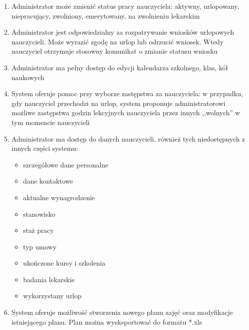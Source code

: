 \documentclass{article}
\begin{document}
\begin{enumerate}
\item Administrator może zmienić status pracy nauczyciela: aktywny, urlopowany, niepracujący, zwolniony, emerytowany, na zwolnieniu lekarskim
\item Administrator jest odpowiedzialny za rozpatrywanie wniosków urlopowych nauczycieli. Może wyrazić zgodę na urlop lub odrzucić wniosek. Wtedy nauczyciel otrzymuje stosowny komunikat o zmianie statusu wniosku
\item Administrator ma pełny dostęp do edycji kalendarza szkolnego, klas, kół naukowych
\item System oferuje pomoc przy wyborze zastępstwa za nauczyciela:
w przypadku, gdy nauczyciel przechodzi na urlop, system proponuje administratorowi możliwe zastępstwa godzin lekcyjnych nauczyciela przez innych ,,wolnych'' w tym momencie nauczycieli
\item Administrator ma dostęp do danych nauczycieli, również tych niedostępnych z innych części systemu:
\begin{itemize}
\item szczegółowe dane personalne
\item dane kontaktowe
\item aktualne wynagrodzenie
\item stanowisko
\item staż pracy
\item typ umowy
\item ukończone kursy i szkolenia
\item badania lekarskie
\item wykorzystany urlop
\end{itemize}
\item System oferuje możliwość stworzenia nowego planu zajęć oraz modyfikacje istniejącego planu. Plan można wyeksportować do formatu *.xls

\end{enumerate}


\end{document}
